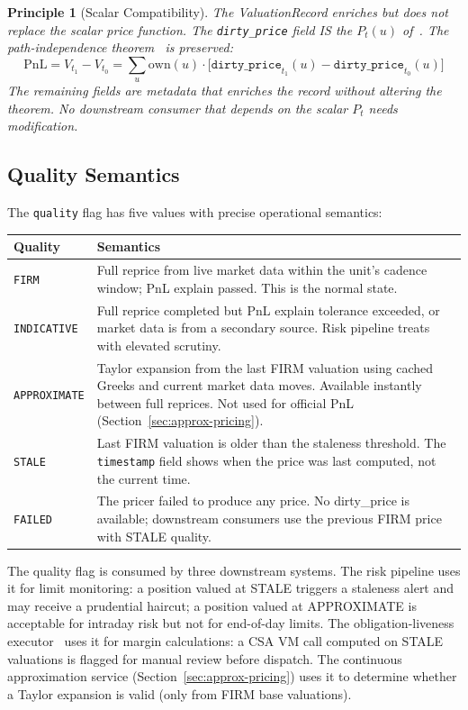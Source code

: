 \documentclass[11pt,a4paper]{article}
\newtheorem{principle}[definition]{Principle}
\begin{document}
\begin{principle}[Scalar Compatibility]
\label{princ:scalar-compat}
The ValuationRecord enriches but does not replace the scalar price function.  The \texttt{dirty\_price} field IS the $P_t(u)$ of~\cite[\S4.1]{ledger}.  The path-independence theorem~\cite[\S4.3]{ledger} is preserved:
\[
\mathrm{PnL} = V_{t_1} - V_{t_0} = \sum_{u} \mathrm{own}(u) \cdot \bigl[\texttt{dirty\_price}_{t_1}(u) - \texttt{dirty\_price}_{t_0}(u)\bigr]
\]
The remaining fields are metadata that enriches the record without altering the theorem.  No downstream consumer that depends on the scalar $P_t$ needs modification.
\end{principle}

\subsection{Quality Semantics}

The \texttt{quality} flag has five values with precise operational semantics:

\begin{center}
\small
\begin{tabular}{l p{9cm}}
\toprule
\textbf{Quality} & \textbf{Semantics} \\
\midrule
\texttt{FIRM} & Full reprice from live market data within the unit's cadence window; PnL explain passed.  This is the normal state. \\
\texttt{INDICATIVE} & Full reprice completed but PnL explain tolerance exceeded, or market data is from a secondary source.  Risk pipeline treats with elevated scrutiny. \\
\texttt{APPROXIMATE} & Taylor expansion from the last FIRM valuation using cached Greeks and current market data moves.  Available instantly between full reprices.  Not used for official PnL (Section~\ref{sec:approx-pricing}). \\
\texttt{STALE} & Last FIRM valuation is older than the staleness threshold.  The \texttt{timestamp} field shows when the price was last computed, not the current time. \\
\texttt{FAILED} & The pricer failed to produce any price.  No dirty\_price is available; downstream consumers use the previous FIRM price with STALE quality. \\
\bottomrule
\end{tabular}
\end{center}

\noindent The quality flag is consumed by three downstream systems.  The risk pipeline uses it for limit monitoring: a position valued at STALE triggers a staleness alert and may receive a prudential haircut; a position valued at APPROXIMATE is acceptable for intraday risk but not for end-of-day limits.  The obligation-liveness executor~\cite[\S14.7]{ledger} uses it for margin calculations: a CSA VM call computed on STALE valuations is flagged for manual review before dispatch.  The continuous approximation service (Section~\ref{sec:approx-pricing}) uses it to determine whether a Taylor expansion is valid (only from FIRM base valuations).
\end{document}
